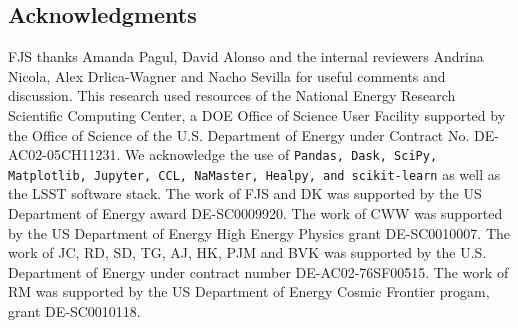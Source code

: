 \documentclass[\docopts]{\docclass}
\begin{document}
\subsection*{Acknowledgments}

FJS thanks Amanda Pagul, David Alonso and the internal reviewers Andrina Nicola, Alex Drlica-Wagner and Nacho Sevilla for useful comments and discussion. This research used resources of the National Energy Research Scientific Computing Center, a DOE Office of Science User Facility supported by the Office of Science of the U.S. Department of Energy under Contract No. DE-AC02-05CH11231. We acknowledge the use of \texttt{Pandas, Dask, SciPy, Matplotlib, Jupyter, CCL, NaMaster, Healpy, and scikit-learn} as well as the LSST software stack.
The work of FJS and DK was supported by the US Department of Energy award DE-SC0009920. The work of CWW was supported by the US Department of Energy High Energy Physics grant DE-SC0010007. The work of JC, RD, SD, TG, AJ, HK, PJM and BVK was supported by the U.S. Department of Energy under contract number DE-AC02-76SF00515. The work of RM was supported by the US Department of Energy Cosmic Frontier progam, grant DE-SC0010118. 







\end{document}
